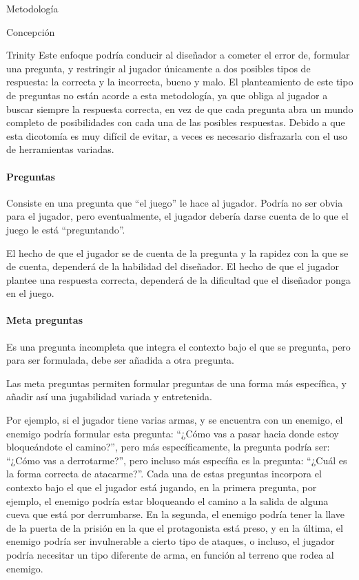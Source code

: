 \begin{section}{Metodología}
\begin{subsection}{Concepción}
\begin{subsubsection}{Trinity}
      Este enfoque podría conducir al diseñador a cometer el error de, formular una pregunta, y restringir al jugador únicamente a dos posibles tipos de respuesta: la correcta y la incorrecta, bueno y malo. El planteamiento de este tipo de preguntas no están acorde a esta metodología, ya que obliga al jugador a buscar siempre la respuesta correcta, en vez de que cada pregunta abra un mundo completo de posibilidades con cada una de las posibles respuestas. Debido a que esta dicotomía es muy difícil de evitar, a veces es necesario disfrazarla con el uso de herramientas variadas.

      \paragraph{Preguntas}

      Consiste en una pregunta que ``el juego'' le hace al jugador. Podría no ser obvia para el jugador, pero eventualmente, el jugador debería darse cuenta de lo que el juego le está ``preguntando''.

      El hecho de que el jugador se de cuenta de la pregunta y la rapidez con la que se de cuenta, dependerá de la habilidad del diseñador. El hecho de que el jugador plantee una respuesta correcta, dependerá de la dificultad que el diseñador ponga en el juego.

      \paragraph{Meta preguntas}

      Es una pregunta incompleta que integra el contexto bajo el que se pregunta, pero para ser formulada, debe ser añadida a otra pregunta.

      Las meta preguntas permiten formular preguntas de una forma más específica, y añadir así una jugabilidad variada y entretenida.

      Por ejemplo, si el jugador tiene varias armas, y se encuentra con un enemigo, el enemigo podría formular esta pregunta: ``¿Cómo vas a pasar hacia donde estoy bloqueándote el camino?'', pero más específicamente, la pregunta podría ser: ``¿Cómo vas a derrotarme?'', pero incluso más específia es la pregunta: ``¿Cuál es la forma correcta de atacarme?''. Cada una de estas preguntas incorpora el contexto bajo el que el jugador está jugando, en la primera pregunta, por ejemplo, el enemigo podría estar bloqueando el camino a la salida de alguna cueva que está por derrumbarse. En la segunda, el enemigo podría tener la llave de la puerta de la prisión en la que el protagonista está preso, y en la última, el enemigo podría ser invulnerable a cierto tipo de ataques, o incluso, el jugador podría necesitar un tipo diferente de arma, en función al terreno que rodea al enemigo.


\end{subsubsection}
\end{subsection}
\end{section}
